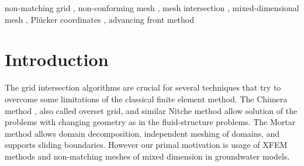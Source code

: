 \documentclass{elsarticle}
\newcommand{\plucker}{Pl\"{u}cker }
\begin{document}
\begin{frontmatter}
\begin{keyword}
non-matching grid \sep
non-conforming mesh \sep
mesh intersection \sep
mixed-dimensional mesh \sep
\plucker coordinates \sep 
advancing front method




\end{keyword}

\end{frontmatter}


\section{Introduction}
The grid intersection algorithms are crucial for several techniques that try to overcome some limitations of the classical finite element method.
The Chimera method \cite{brezzi_analysis_2001}, also called overset grid, and similar Nitche method \cite{massing_efficient_2013}
allow solution of the problems with changing geometry as in the fluid-structure problems. 
The Mortar method \cite{belgacem_mortar_1999} allows domain decomposition, independent meshing of domains, and supports sliding boundaries.
However our primal motivation is usage of XFEM methods \cite{fries_extended/generalized_2010} and non-matching meshes of mixed dimension in groundwater models.
\end{document}
